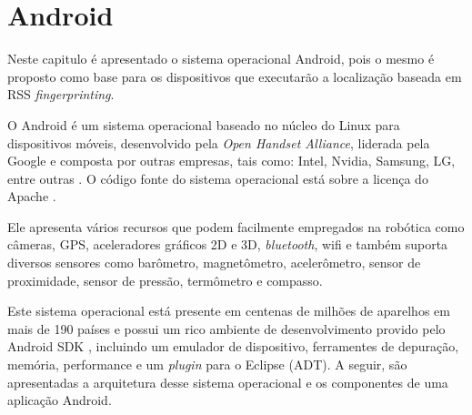\chapter{Android}
\label{android}

Neste capitulo é apresentado o sistema operacional Android, pois o mesmo é proposto 
como base para os dispositivos que executarão a localização baseada em RSS \textit{fingerprinting}.

O Android é um sistema operacional baseado no núcleo do Linux para dispositivos móveis, 
desenvolvido pela \textit{Open Handset Alliance}, liderada pela Google e composta por
outras empresas, tais como: Intel, Nvidia, Samsung, LG, entre outras \cite{android0}. 
O código fonte do sistema operacional está sobre a licença do Apache \cite{apacheLicence}. 

Ele apresenta vários recursos que podem facilmente empregados na robótica como
câmeras, GPS, aceleradores gráficos 2D e 3D, \textit{bluetooth}, wifi e também
suporta diversos sensores como barômetro, magnetômetro, acelerômetro, 
 sensor de proximidade, sensor de pressão, termômetro e compasso. 
 
 Este sistema operacional está presente em centenas 
de milhões de aparelhos em mais de 190 países \cite{androidDev} e possui um rico
ambiente de desenvolvimento provido pelo Android SDK \cite{sdk}, incluindo um emulador de dispositivo, 
ferramentes de depuração, memória, performance e um \textit{plugin} para o Eclipse (ADT). 
A seguir, são apresentadas a arquitetura desse sistema operacional 
e os componentes de uma aplicação Android.

\clearpage

